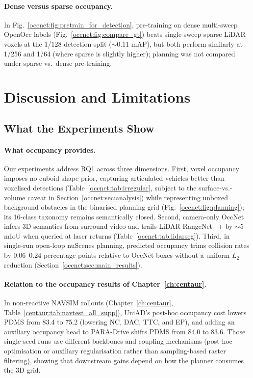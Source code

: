 \paragraph{Dense versus sparse occupancy.} In Fig.~\ref{occnet:fig:pretrain_for_detection}, pre-training on dense multi-sweep OpenOcc labels (Fig.~\ref{occnet:fig:compare_gt}) beats single-sweep sparse LiDAR voxels at the 1/128 detection split ($\sim$0.11  mAP), but both perform similarly at 1/256 and 1/64 (where sparse is slightly higher); planning was not compared under sparse vs.\ dense pre-training.

\section{Discussion and Limitations}\label{occnet:sec:discussion}

\subsection{What the Experiments Show}\label{occnet:sec:disc_show}

\paragraph{What occupancy provides.} Our experiments address RQ1 across three dimensions. First, voxel occupancy imposes no cuboid shape prior, capturing articulated vehicles better than voxelised detections (Table~\ref{occnet:tab:irregular}, subject to the surface-vs.-volume caveat in Section~\ref{occnet:sec:analysis}) while representing unboxed background obstacles in the binarised planning grid (Fig.~\ref{occnet:fig:planning}); its 16-class taxonomy remains semantically closed. Second, camera-only OccNet infers 3D semantics from surround video and trails LiDAR RangeNet++ by $\sim$5 mIoU when queried at laser returns (Table~\ref{occnet:tab:lidarseg}). Third, in single-run open-loop nuScenes planning, predicted occupancy trims collision rates by 0.06--0.24 percentage points relative to OccNet boxes without a uniform $L_2$ reduction (Section~\ref{occnet:sec:main_results}).

\paragraph{Relation to the occupancy results of Chapter~\ref{ch:centaur}.} In non-reactive NAVSIM rollouts (Chapter~\ref{ch:centaur}, Table~\ref{centaur:tab:navtest_all_supp}), UniAD's post-hoc occupancy cost lowers PDMS from 83.4 to 75.2 (lowering NC, DAC, TTC, and EP), and adding an auxiliary occupancy head to PARA-Drive shifts PDMS from 84.0 to 83.6. Those single-seed runs use different backbones and coupling mechanisms (post-hoc optimisation or auxiliary regularisation rather than sampling-based raster filtering), showing that downstream gains depend on how the planner consumes the 3D grid.

